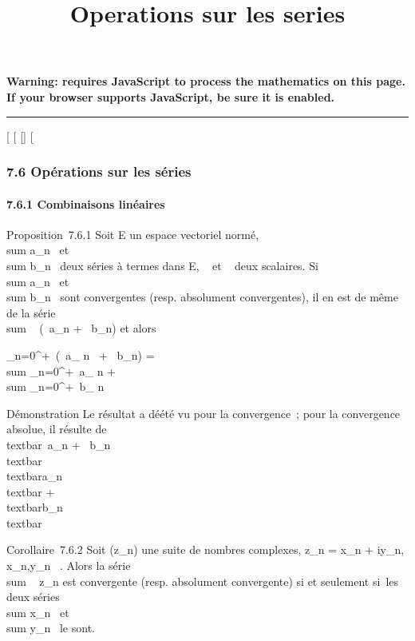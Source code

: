 \documentclass[]{article}
\title{Operations sur les series}
\author{}
\date{}
\begin{document}
\maketitle

\textbf{Warning: 
requires JavaScript to process the mathematics on this page.\\ If your
browser supports JavaScript, be sure it is enabled.}

\begin{center}\rule{3in}{0.4pt}\end{center}

{[}
{[}
{[}{]}
{[}

\subsubsection{7.6 Opérations sur les séries}

\paragraph{7.6.1 Combinaisons linéaires}

Proposition~7.6.1 Soit E un espace vectoriel normé,
\\sum  a\_n~ et
\\sum  b\_n~ deux
séries à termes dans E, \alpha~ et \beta~ deux scalaires. Si
\\sum  a\_n~ et
\\sum  b\_n~ sont
convergentes (resp. absolument convergentes), il en est de même de la
série \\sum ~
(\alpha~a\_n + \beta~b\_n) et alors

\sum \_n=0^+\infty~(\alpha~a\_ n~ +
\beta~b\_n) = \alpha~\\sum
\_n=0^+\infty~a\_ n + \beta~\\sum
\_n=0^+\infty~b\_ n

Démonstration Le résultat a dé été vu pour la convergence~; pour la
convergence absolue, il résulte de
\\textbar{}\alpha~a\_n +
\beta~b\_n\\textbar{}
\leq\textbar{}\alpha~\textbar{}\,\\textbar{}a\_n\\textbar{}
+
\textbar{}\beta~\textbar{}\,\\textbar{}b\_n\\textbar{}

Corollaire~7.6.2 Soit (z\_n) une suite de nombres complexes,
z\_n = x\_n + iy\_n, x\_n,y\_n \in
{}~. Alors la série \\sum ~
z\_n est convergente (resp. absolument convergente) si et
seulement si~les deux séries
\\sum  x\_n~ et
\\sum  y\_n~ le
sont.
\end{document}
